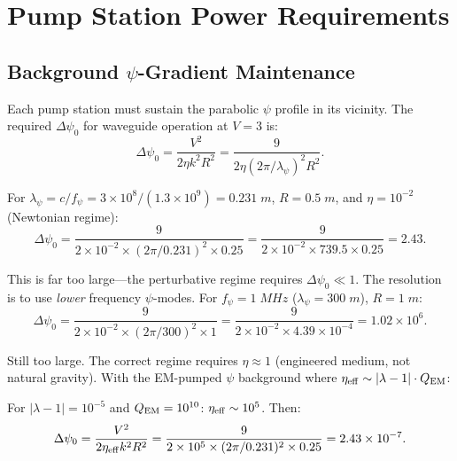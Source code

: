 \documentclass[twocolumn,superscriptaddress,prd]{revtex4-2}
\begin{document}
\section{Pump Station Power Requirements}
\label{sec:pump}

\subsection{Background $\psi$-Gradient Maintenance}

Each pump station must sustain the parabolic $\psi$ profile
in its vicinity.  The required $\Delta\psi_0$ for waveguide
operation at $V = 3$ is:
\begin{equation}
\Delta\psi_0 = \frac{V^2}{2\eta k^2 R^2} = \frac{9}{2\eta(2\pi/\lambda_\psi)^2 R^2}.
\end{equation}

For $\lambda_\psi = c/f_\psi = 3\times10^8/(1.3\times10^9) = 0.231\;\si{m}$,
$R = 0.5\;\si{m}$, and $\eta = 10^{-2}$ (Newtonian regime):
\begin{equation}
\Delta\psi_0 = \frac{9}{2 \times 10^{-2} \times (2\pi/0.231)^2 \times 0.25} = \frac{9}{2 \times 10^{-2} \times 739.5 \times 0.25} = 2.43.
\end{equation}

This is far too large---the perturbative regime requires
$\Delta\psi_0 \ll 1$.  The resolution is to use \emph{lower}
frequency $\psi$-modes.  For $f_\psi = 1\;\si{MHz}$
($\lambda_\psi = 300\;\si{m}$), $R = 1\;\si{m}$:
\begin{equation}
\Delta\psi_0 = \frac{9}{2\times10^{-2}\times(2\pi/300)^2\times 1} = \frac{9}{2\times10^{-2}\times 4.39\times10^{-4}} = 1.02\times10^{6}.
\end{equation}

Still too large.  The correct regime requires $\eta \approx 1$
(engineered medium, not natural gravity).  With the EM-pumped
$\psi$ background where $\eta_{\rm eff} \sim |\lambda-1| \cdot Q_{\rm EM}$:

For $|\lambda-1| = 10^{-5}$ and $Q_{\rm EM} = 10^{10}$:
$\eta_{\rm eff} \sim 10^5$.  Then:
\begin{equation}
\Delta\psi_0 = \frac{V^2}{2\eta_{\rm eff}k^2 R^2} = \frac{9}{2\times10^5\times(2\pi/0.231)^2\times0.25} = 2.43\times10^{-7}.
\end{equation}
\end{document}
